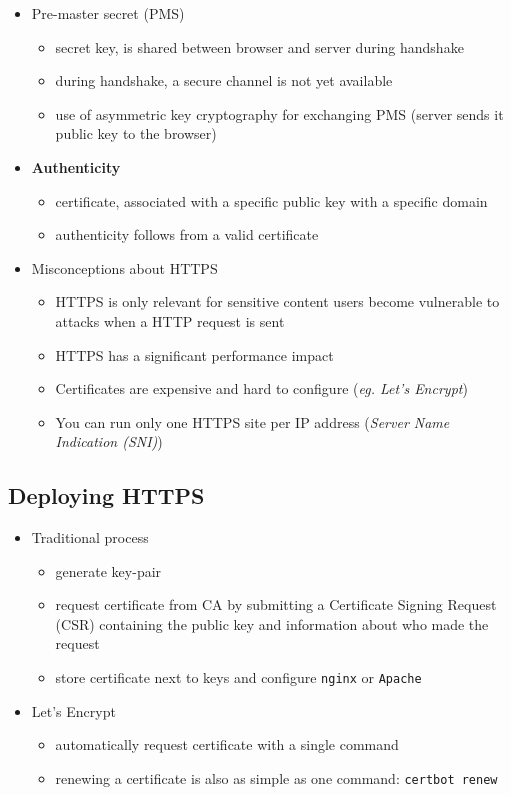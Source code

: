 \documentclass[12pt,titlepage,a4paper]{report}
\begin{document}
\begin{itemize}
		\item Pre-master secret (PMS)
		\begin{itemize}
			\item secret key, is shared between browser and server during handshake
			\item during handshake, a secure channel is not yet available
			\item use of asymmetric key cryptography for exchanging PMS (server sends it public key to the browser)
		\end{itemize}
	
		\item \textbf{Authenticity}
		\begin{itemize}
			\item certificate, associated with a specific public key with a specific domain
			\item authenticity follows from a valid certificate
		\end{itemize}
	
		\item Misconceptions about HTTPS
		\begin{itemize}
			\item HTTPS is only relevant for sensitive content 
				\subitem users become vulnerable to attacks when a HTTP request is sent
			\item HTTPS has a significant performance impact
			\item Certificates are expensive and hard to configure (\emph{eg. Let's Encrypt})
			\item You can run only one HTTPS site per IP address (\emph{Server Name Indication (SNI)})
		\end{itemize}
	\end{itemize}

	\subsection{Deploying HTTPS}
	\begin{itemize}
		\item Traditional process
		\begin{itemize}
			\item generate key-pair
			\item request certificate from CA by submitting a Certificate Signing Request (CSR) containing the public key and information about who made the request
			\item store certificate next to keys and configure \texttt{nginx} or \texttt{Apache}
		\end{itemize}
		\item Let's Encrypt
		\begin{itemize}
			\item automatically request certificate with a single command
			\item renewing a certificate is also as simple as one command: \texttt{certbot renew}
		\end{itemize}
	\end{itemize}
\end{document}
